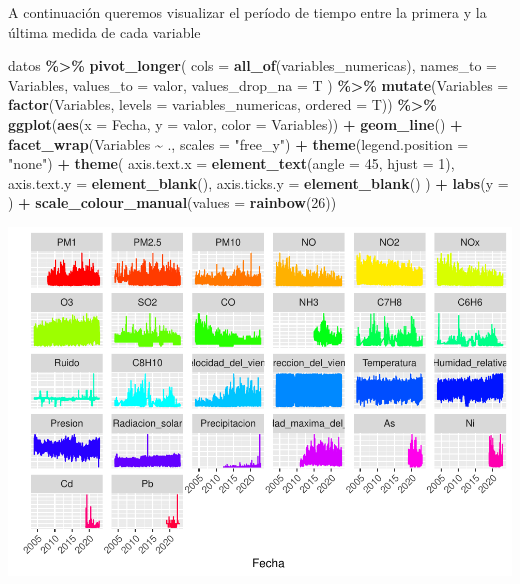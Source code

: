 \documentclass[notspecified,article,submit,moreauthors,pdftex]{Definitions/mdpi}
\newenvironment{Shaded}{\begin{snugshade}}{\end{snugshade}}
\newcommand{\AttributeTok}[1]{\textcolor[rgb]{0.13,0.29,0.53}{#1}}
\newcommand{\DecValTok}[1]{\textcolor[rgb]{0.00,0.00,0.81}{#1}}
\newcommand{\FunctionTok}[1]{\textcolor[rgb]{0.13,0.29,0.53}{\textbf{#1}}}
\newcommand{\NormalTok}[1]{#1}
\newcommand{\SpecialCharTok}[1]{\textcolor[rgb]{0.81,0.36,0.00}{\textbf{#1}}}
\newcommand{\StringTok}[1]{\textcolor[rgb]{0.31,0.60,0.02}{#1}}
\begin{document}
A continuación queremos visualizar el período de tiempo entre la primera
y la última medida de cada variable

\begin{Shaded}
\begin{Highlighting}[]
\NormalTok{datos }\SpecialCharTok{\%\textgreater{}\%}
  \FunctionTok{pivot\_longer}\NormalTok{(}
    \AttributeTok{cols =} \FunctionTok{all\_of}\NormalTok{(variables\_numericas),}
    \AttributeTok{names\_to =} \StringTok{\textquotesingle{}Variables\textquotesingle{}}\NormalTok{,}
    \AttributeTok{values\_to =} \StringTok{\textquotesingle{}valor\textquotesingle{}}\NormalTok{,}
    \AttributeTok{values\_drop\_na =}\NormalTok{ T}
\NormalTok{  ) }\SpecialCharTok{\%\textgreater{}\%}
  \FunctionTok{mutate}\NormalTok{(}\AttributeTok{Variables =} \FunctionTok{factor}\NormalTok{(Variables, }\AttributeTok{levels =}\NormalTok{ variables\_numericas, }\AttributeTok{ordered =}\NormalTok{ T)) }\SpecialCharTok{\%\textgreater{}\%}
  \FunctionTok{ggplot}\NormalTok{(}\FunctionTok{aes}\NormalTok{(}\AttributeTok{x =}\NormalTok{ Fecha, }\AttributeTok{y =}\NormalTok{ valor, }\AttributeTok{color =}\NormalTok{ Variables)) }\SpecialCharTok{+}
  \FunctionTok{geom\_line}\NormalTok{() }\SpecialCharTok{+}
  \FunctionTok{facet\_wrap}\NormalTok{(Variables }\SpecialCharTok{\textasciitilde{}}\NormalTok{ ., }\AttributeTok{scales =} \StringTok{"free\_y"}\NormalTok{) }\SpecialCharTok{+}
  \FunctionTok{theme}\NormalTok{(}\AttributeTok{legend.position =} \StringTok{"none"}\NormalTok{) }\SpecialCharTok{+}
  \FunctionTok{theme}\NormalTok{(}
    \AttributeTok{axis.text.x =} \FunctionTok{element\_text}\NormalTok{(}\AttributeTok{angle =} \DecValTok{45}\NormalTok{, }\AttributeTok{hjust =} \DecValTok{1}\NormalTok{),}
    \AttributeTok{axis.text.y =} \FunctionTok{element\_blank}\NormalTok{(),}
    \AttributeTok{axis.ticks.y =} \FunctionTok{element\_blank}\NormalTok{()}
\NormalTok{  ) }\SpecialCharTok{+}
  \FunctionTok{labs}\NormalTok{(}\AttributeTok{y =} \StringTok{\textquotesingle{}\textquotesingle{}}\NormalTok{) }\SpecialCharTok{+}
  \FunctionTok{scale\_colour\_manual}\NormalTok{(}\AttributeTok{values =} \FunctionTok{rainbow}\NormalTok{(}\DecValTok{26}\NormalTok{)) }
\end{Highlighting}
\end{Shaded}

\includegraphics{Memoria_files/figure-latex/unnamed-chunk-12-1.pdf}
\end{document}
